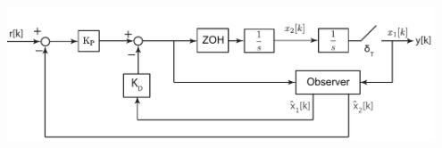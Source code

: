 \documentclass[twoside]{article}
\begin{document}
\begin{enumerate}
\begin{center}
  \begin{minipage}[h]{0.9\linewidth}
    \begin{center}
      \includegraphics[width=0.95\textwidth]{block_PD_obs}
    \end{center}
  \end{minipage}
    \end{center}





\end{enumerate}


\end{document}
